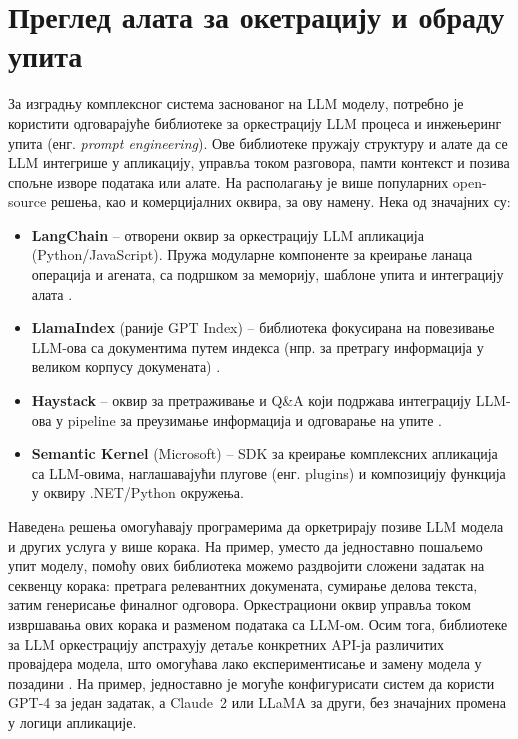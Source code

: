 \section{Преглед алата за окетрацију и обраду упита}

За изградњу комплексног система заснованог на LLM моделу, потребно је користити одговарајуће библиотеке за оркестрацију LLM процеса и инжењеринг упита (енг. \textit{prompt engineering}). Ове библиотеке пружају структуру и алате да се LLM интегрише у апликацију, управља током разговора, памти контекст и позива спољне изворе података или алате. На располагању је више популарних open-source решења, као и комерцијалних оквира, за ову намену. Нека од значајних су:
\begin{itemize}
    \item \textbf{LangChain} -- отворени оквир за оркестрацију LLM апликација (Python/JavaScript). Пружа модуларне компоненте за креирање ланаца операција и агената, са подршком за меморију, шаблоне упита и интеграцију алата \cite{ibm_what_is_langchain_2023,patriwala_langchain_2025}.
    \item \textbf{LlamaIndex} (раније GPT Index) -- библиотека фокусирана на повезивање LLM-ова са документима путем индекса (нпр. за претрагу информација у великом корпусу докумената) \cite{patriwala_langchain_2025}.
    \item \textbf{Haystack} -- оквир за претраживање и Q\&A који подржава интеграцију LLM-ова у pipeline за преузимање информација и одговарање на упите \cite{patriwala_langchain_2025}.
    \item \textbf{Semantic Kernel} (Microsoft) -- SDK за креирање комплексних апликација са LLM-овима, наглашавајући плугове (енг. plugins) и композицију функција у оквиру .NET/Python окружења.
\end{itemize}

Наведенa решења омогућавају програмерима да оркетрирају позиве LLM модела и других услуга у више корака. На пример, уместо да једноставно пошаљемо упит моделу, помоћу ових библиотека можемо раздвојити сложени задатак на секвенцу корака: претрага релевантних докумената, сумирање делова текста, затим генерисање финалног одговора. Оркестрациони оквир управља током извршавања ових корака и разменом података са LLM-ом. Осим тога, библиотеке за LLM оркестрацију апстрахују детаље конкретних API-ја различитих провајдера модела, што омогућава лако експериментисање и замену модела у позадини \cite{ibm_what_is_langchain_2023,patriwala_langchain_2025}. На пример, једноставно је могуће конфигурисати систем да користи GPT-4 за један задатак, а Claude~2 или LLaMA за други, без значајних промена у логици апликације.

